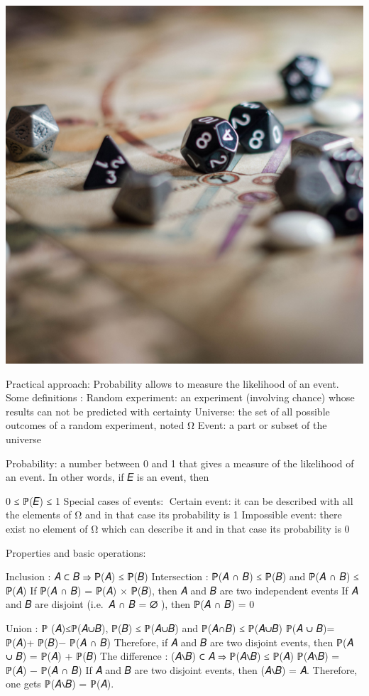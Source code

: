 \documentclass[
  letterpaper,
  DIV=11,
  numbers=noendperiod]{scrreprt}
\begin{document}
\includegraphics{../img/dice_map.jpg}

Practical approach: Probability allows to measure the likelihood of an
event. Some definitions : Random experiment: an experiment (involving
chance) whose results can not be predicted with certainty Universe: the
set of all possible outcomes of a random experiment, noted Ω Event: a
part or subset of the universe

Probability: a number between 0 and 1 that gives a measure of the
likelihood of an event. In other words, if 𝐸 is an event, then

0 ≤ ℙ(𝐸) ≤ 1 Special cases of events: Certain event: it can be described
with all the elements of Ω and in that case its probability is 1
Impossible event: there exist no element of Ω which can describe it and
in that case its probability is 0

Properties and basic operations:

Inclusion : 𝐴 ⊂ 𝐵 ⇒ ℙ(𝐴) ≤ ℙ(𝐵) Intersection : ℙ(𝐴 ∩ 𝐵) ≤ ℙ(𝐵) and ℙ(𝐴 ∩
𝐵) ≤ ℙ(𝐴) If ℙ(𝐴 ∩ 𝐵) = ℙ(𝐴) × ℙ(𝐵), then 𝐴 and 𝐵 are two independent
events If 𝐴 and 𝐵 are disjoint (i.e.~𝐴 ∩ 𝐵 = ∅ ), then ℙ(𝐴 ∩ 𝐵) = 0

Union : ℙ (𝐴)≤ℙ(𝐴∪𝐵), ℙ(𝐵) ≤ ℙ(𝐴∪𝐵) and ℙ(𝐴∩𝐵) ≤ ℙ(𝐴∪𝐵) ℙ(𝐴 ∪ 𝐵)= ℙ(𝐴)+
ℙ(𝐵)− ℙ(𝐴 ∩ 𝐵) Therefore, if 𝐴 and 𝐵 are two disjoint events, then ℙ(𝐴 ∪
𝐵) = ℙ(𝐴) + ℙ(𝐵) The difference : (𝐴∖𝐵) ⊂ 𝐴 ⇒ ℙ(𝐴∖𝐵) ≤ ℙ(𝐴) ℙ(𝐴∖𝐵) =
ℙ(𝐴) − ℙ(𝐴 ∩ 𝐵) If 𝐴 and 𝐵 are two disjoint events, then (𝐴∖𝐵) = 𝐴.
Therefore, one gets ℙ(𝐴∖𝐵) = ℙ(𝐴).
\end{document}
